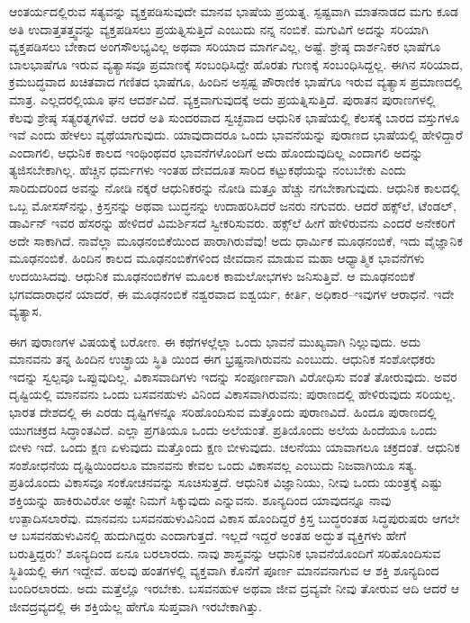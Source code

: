 ಆಂತರ್ಯದಲ್ಲಿರುವ ಸತ್ಯವನ್ನು ವ್ಯಕ್ತಪಡಿಸುವುದೇ ಮಾನವ ಭಾಷೆಯ ಪ್ರಯತ್ನ. ಸ್ಪಷ್ಟವಾಗಿ ಮಾತನಾಡದ ಮಗು ಕೂಡ ಅತಿ ಉದಾತ್ತತತ್ತ್ವವನ್ನು ವ್ಯಕ್ತಪಡಿಸಲು ಪ್ರಯತ್ನಿಸುತ್ತಿದೆ ಎಂಬುದು ನನ್ನ ನಂಬಿಕೆ. ಮಗುವಿಗೆ ಅದನ್ನು ಸರಿಯಾಗಿ ವ್ಯಕ್ತಪಡಿಸಲು ಬೇಕಾದ ಅಂಗಸೌಲಭ್ಯವಿಲ್ಲ ಅಥವಾ ಸರಿಯಾದ ಮಾರ್ಗವಿಲ್ಲ, ಅಷ್ಟೆ. ಶ್ರೇಷ್ಠ ದಾರ್ಶನಿಕರ ಭಾಷೆಗೂ ಬಾಲಭಾಷೆಗೂ ಇರುವ ವ್ಯತ್ಯಾಸವೂ ಪ್ರಮಾಣಕ್ಕೆ ಸಂಬಂಧಿಸಿದ್ದೇ ಹೊರತು ಗುಣಕ್ಕೆ ಸಂಬಂಧಿಸಿದ್ದಲ್ಲ. ಈಗಿನ ಸರಿಯಾದ, ಕ್ರಮಬದ್ಧವಾದ ಖಚಿತವಾದ ಗಣಿತದ ಭಾಷೆಗೂ, ಹಿಂದಿನ ಅಸ್ಪಷ್ಟ ಪೌರಾಣಿಕ ಭಾಷೆಗೂ ಇರುವ ವ್ಯತ್ಯಾಸ ಪ್ರಮಾಣದಲ್ಲಿ ಮಾತ್ರ. ಎಲ್ಲದರಲ್ಲಿಯೂ ಘನ ಆದರ್ಶವಿದೆ. ವ್ಯಕ್ತವಾಗುವುದಕ್ಕೆ ಅದು ಪ್ರಯತ್ನಿಸುತ್ತಿದೆ. ಪುರಾತನ ಪುರಾಣಗಳಲ್ಲಿ ಕೆಲವು ಶ್ರೇಷ್ಠ ಸತ್ಯರತ್ನಗಳಿವೆ. ಆದರೆ ಅತಿ ಸುಂದರವಾದ ಸ್ವಚ್ಛವಾದ ಆಧುನಿಕ ಭಾಷೆಯಲ್ಲಿ ಕೆಲಸಕ್ಕೆ ಬಾರದ ವಸ್ತುಗಳೂ ಇವೆ ಎಂದು ಹೇಳಲು ವ್ಯಥೆಯಾಗುವುದು. ಯಾವುದಾದರೂ ಒಂದು ಭಾವನೆಯನ್ನು ಪುರಾಣದ ಭಾಷೆಯಲ್ಲಿ ಹೇಳಿದ್ದಾರೆ ಎಂದಾಗಲಿ, ಆಧುನಿಕ ಕಾಲದ ಇಂಥಿಂಥವರ ಭಾವನೆಗಳೊಂದಿಗೆ ಅದು ಹೊಂದುವುದಿಲ್ಲ ಎಂದಾಗಲಿ ಅದನ್ನು ತ್ಯಜಿಸಬೇಕಾಗಿಲ್ಲ. ಹೆಚ್ಚಿನ ಧರ್ಮಗಳು ಇಂತಹ ದೇವದೂತ ಸಾರಿದ ಕಟ್ಟುಕಥೆಯನ್ನು ನಂಬಬೇಕು ಎಂದು ಸಾರಿದುದರಿಂದ ಅವನ್ನು ನೋಡಿ ನಕ್ಕರೆ ಆಧುನಿಕರನ್ನು ನೋಡಿ ಮತ್ತೂ ಹೆಚ್ಚು ನಗಬೇಕಾಗುವುದು. ಆಧುನಿಕ ಕಾಲದಲ್ಲಿ ಒಬ್ಬ ಮೋಸಸ್​ನನ್ನು, ಕ್ರಿಸ್ತನನ್ನು ಅಥವಾ ಬುದ್ಧನನ್ನು ಉದಾಹರಿಸಿದರೆ ಜನರು ನಗುವರು. ಆದರೆ ಹಕ್ಸ್​ಲೆ, ಟೆಂಡಲ್​, ಡಾರ್ವಿನ್​ ಇವರ ಹೆಸರನ್ನು ಹೇಳಿದರೆ ವಿಮರ್ಶಿಸದೆ ಸ್ವೀಕರಿಸುವರು. ಹಕ್ಸ್​ಲೆ ಹೀಗೆ ಹೇಳಿರುವನು ಎಂದರೆ ಅನೇಕರಿಗೆ ಅದೇ ಸಾಕಾಗಿದೆ. ನಾವೆಲ್ಲಾ ಮೂಢನಂಬಿಕೆಯಿಂದ ಪಾರಾಗಿರುವೆವು! ಅದು ಧಾರ್ಮಿಕ ಮೂಢನಂಬಿಕೆ, ಇದು ವೈಜ್ಞಾನಿಕ ಮೂಢನಂಬಿಕೆ. ಹಿಂದಿನ ಕಾಲದ ಮೂಢನಂಬಿಕೆಗಳಿಂದ ಜೀವದಾನ ಮಾಡುವ ಮಹಾ ಆಧ್ಯಾತ್ಮಿಕ ಭಾವನೆಗಳು ಉದಯಿಸಿದವು. ಆಧುನಿಕ ಮೂಢನಂಬಿಕೆಗಳ ಮೂಲಕ ಕಾಮಲೋಭಗಳು ಜನಿಸುತ್ತಿವೆ. ಆ ಮೂಢನಂಬಿಕೆ ಭಗವದಾರಾಧನೆ ಯಾದರೆ, ಈ ಮೂಢನಂಬಿಕೆ ನಶ್ವರವಾದ ಐಶ್ವರ್ಯ, ಕೀರ್ತಿ, ಅಧಿಕಾರ–ಇವುಗಳ ಆರಾಧನೆ. ಇದೇ ವ್ಯತ್ಯಾಸ.

ಈಗ ಪುರಾಣಗಳ ವಿಷಯಕ್ಕೆ ಬರೋಣ. ಈ ಕಥೆಗಳಲ್ಲೆಲ್ಲಾ ಒಂದು ಭಾವನೆ ಮುಖ್ಯವಾಗಿ ನಿಲ್ಲುವುದು. ಅದು ಮಾನವನು ತನ್ನ ಹಿಂದಿನ ಉಚ್ಛ್ರಾಯ ಸ್ಥಿತಿ ಯಿಂದ ಈಗ ಭ್ರಷ್ಟನಾಗಿರುವನು ಎಂಬುದು. ಆಧುನಿಕ ಸಂಶೋಧಕರು ಇದನ್ನು ಸ್ವಲ್ಪವೂ ಒಪ್ಪುವುದಿಲ್ಲ. ವಿಕಾಸವಾದಿಗಳು ಇದನ್ನು ಸಂಪೂರ್ಣವಾಗಿ ವಿರೋಧಿಸು ವಂತೆ ತೋರುವುದು. ಅವರ ದೃಷ್ಟಿಯಲ್ಲಿ ಮಾನವನು ಒಂದು ಬಸವನಹುಳು ವಿನಿಂದ ವಿಕಾಸವಾಗಿರುವನು; ಪುರಾಣದಲ್ಲಿ ಹೇಳಿರುವುದು ಸರಿಯಲ್ಲ. ಭಾರತ ದೇಶದಲ್ಲಿ ಈ ಎರಡು ದೃಷ್ಟಿಗಳನ್ನೂ ಸರಿಹೊಂದಿಸುವ ಮತ್ತೊಂದು ಪುರಾಣವಿದೆ. ಹಿಂದೂ ಪುರಾಣದಲ್ಲಿ ಯುಗಚಕ್ರದ ಸಿದ್ಧಾಂತವಿದೆ. ಎಲ್ಲಾ ಪ್ರಗತಿಯೂ ಒಂದು ಅಲೆಯಂತೆ. ಪ್ರತಿಯೊಂದು ಅಲೆಯ ಹಿಂದೆಯೂ ಒಂದು ಬೀಳು ಇದೆ. ಒಂದು ಕ್ಷಣ ಏಳುವುದು ಮತ್ತೊಂದು ಕ್ಷಣ ಬೀಳುವುದು. ಚಲನೆಯು ಯಾವಾಗಲೂ ಚಕ್ರದಂತೆ. ಆಧುನಿಕ ಸಂಶೋಧನೆಯ ದೃಷ್ಟಿಯಿಂದಲೂ ಮಾನವನು ಕೇವಲ ಒಂದು ವಿಕಾಸವಲ್ಲ ಎಂಬುದು ನಿಜವಾಗಿಯೂ ಸತ್ಯ. ಪ್ರತಿಯೊಂದು ವಿಕಾಸವೂ ಸಂಕೋಚನವನ್ನು ಸೂಚಿಸುತ್ತದೆ. ಆಧುನಿಕ ವಿಜ್ಞಾನಿಯು, ನೀವು ಒಂದು ಯಂತ್ರಕ್ಕೆ ಎಷ್ಟು ಶಕ್ತಿಯನ್ನು ಹಾಕಿರುವಿರೋ ಅಷ್ಟೇ ನಿಮಗೆ ಸಿಕ್ಕುವುದು ಎನ್ನುವನು. ಶೂನ್ಯದಿಂದ ಯಾವುದನ್ನೂ ನಾವು ಉತ್ಪಾದಿಸಲಾರೆವು. ಮಾನವನು ಬಸವನಹುಳುವಿನಿಂದ ವಿಕಾಸ ಹೊಂದಿದ್ದರೆ ಕ್ರಿಸ್ತ ಬುದ್ಧರಂತಹ ಸಿದ್ಧಪುರುಷರು ಆಗಲೇ ಆ ಬಸವನಹುಳುವಿನಲ್ಲಿ ಹುದುಗಿದ್ದರು ಎಂದಾಗುತ್ತದೆ. ಇಲ್ಲದೆ ಇದ್ದರೆ ಅಂತಹ ಅದ್ಭುತ ವ್ಯಕ್ತಿಗಳು ಹೇಗೆ ಬರುತ್ತಿದ್ದರು? ಶೂನ್ಯದಿಂದ ಏನೂ ಬರಲಾರದು. ನಾವು ಶಾಸ್ತ್ರವನ್ನು ಆಧುನಿಕ ಭಾವನೆಯೊಂದಿಗೆ ಸರಿಹೊಂದಿಸುವ ಸ್ಥಿತಿಯಲ್ಲಿ ಈಗ ಇದ್ದೇವೆ. ಹಲವು ಹಂತಗಳಲ್ಲಿ ವ್ಯಕ್ತವಾಗಿ ಕೊನೆಗೆ ಪೂರ್ಣ ಮಾನವನಾಗುವ ಆ ಶಕ್ತಿ ಶೂನ್ಯದಿಂದ ಬಂದಿರಲಾರದು. ಅದು ಮತ್ತೆಲ್ಲೊ ಇರಬೇಕು. ಬಸವನಹುಳ ಅಥವಾ ಜೀವ ದ್ರವ್ಯವೇ ನೀವು ತೋರುವ ಆದಿ ಆದರೆ ಆ ಜೀವದ್ರವ್ಯದಲ್ಲಿ ಈ ಶಕ್ತಿಯೆಲ್ಲ ಹೇಗೊ ಸುಪ್ತವಾಗಿ ಇರಬೇಕಾಗಿತ್ತು.

